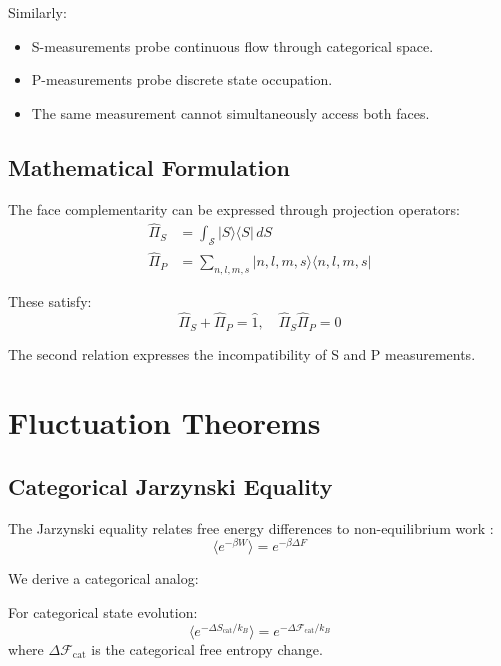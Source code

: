 Similarly:
\begin{itemize}
    \item S-measurements probe continuous flow through categorical space.
    \item P-measurements probe discrete state occupation.
    \item The same measurement cannot simultaneously access both faces.
\end{itemize}

\subsection{Mathematical Formulation}

The face complementarity can be expressed through projection operators:
\begin{align}
    \hat{\Pi}_S &= \int_{\mathcal{S}} |S\rangle \langle S| \, dS \\
    \hat{\Pi}_P &= \sum_{n,l,m,s} |n,l,m,s\rangle \langle n,l,m,s|
\end{align}

These satisfy:
\begin{equation}
    \hat{\Pi}_S + \hat{\Pi}_P = \hat{1}, \quad \hat{\Pi}_S \hat{\Pi}_P = 0
\end{equation}

The second relation expresses the incompatibility of S and P measurements.

\section{Fluctuation Theorems}

\subsection{Categorical Jarzynski Equality}

The Jarzynski equality relates free energy differences to non-equilibrium work \cite{jarzynski1997}:
\begin{equation}
    \langle e^{-\beta W} \rangle = e^{-\beta \Delta F}
\end{equation}

We derive a categorical analog:

\begin{theorem}
For categorical state evolution:
\begin{equation}
    \langle e^{-\Delta S_{\text{cat}}/k_B} \rangle = e^{-\Delta \mathcal{F}_{\text{cat}}/k_B}
\end{equation}
where $\Delta \mathcal{F}_{\text{cat}}$ is the categorical free entropy change.
\end{theorem}

